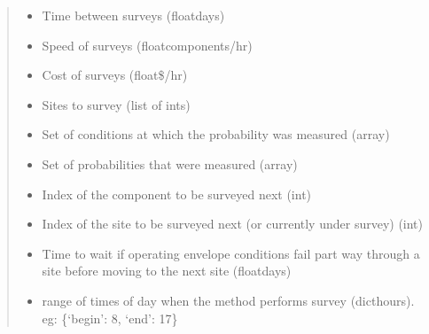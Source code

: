 \documentclass[letterpaper,10pt,english]{sphinxmanual}
\begin{document}
\begin{fulllineitems}
\begin{quote}
\begin{description}
\begin{itemize}
\item {} 
 \textendash{} Time between surveys (float\textendash{}days)

\item {} 
 \textendash{} Speed of surveys (float\textendash{}components/hr)

\item {} 
 \textendash{} Cost of surveys (float\textendash{}\$/hr)

\item {} 
 \textendash{} Sites to survey (list of ints)

\item {} 
 \textendash{} Set of conditions at which the probability was measured (array)

\item {} 
 \textendash{} Set of probabilities that were measured (array)

\item {} 
 \textendash{} Index of the component to be surveyed next (int)

\item {} 
 \textendash{} Index of the site to be surveyed next (or currently under survey) (int)

\item {} 
 \textendash{} Time to wait if operating envelope conditions fail part way through a site before
moving to the next site (float\textendash{}days)

\item {} 
 \textendash{} range of times of day when the method performs survey (dict\textendash{}hours). eg: \{‘begin’: 8, ‘end’: 17\}

\end{itemize}

\end{description}\end{quote}


\end{fulllineitems}
\end{document}
